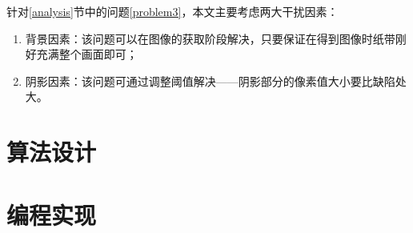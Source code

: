 \documentclass[UTF8]{ctexart}
\begin{document}
			\indent 针对\ref{analysis}节中的问题\ref{problem3}，本文主要考虑两大干扰因素：
			\begin{enumerate}[leftmargin=50pt]
				\item 背景因素：该问题可以在图像的获取阶段解决，只要保证在得到图像时纸带刚好充满整个画面即可；
				\item 阴影因素：该问题可通过调整阈值解决——阴影部分的像素值大小要比缺陷处大。
			\end{enumerate}
	\section{算法设计}
%




	\section{编程实现\protect \footnotemark[1]}
\end{document}
